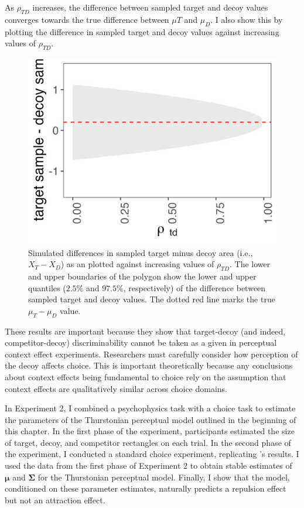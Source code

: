 As $\rho_{TD}$ increases, the difference between sampled target and decoy values converges towards the true difference between $\mu{T}$ and $\mu_{D}$. I also show this by plotting the difference in sampled target and decoy values against increasing values of $\rho_{TD}$.

\begin{figure}
   \includegraphics[width=125mm]{figures/sim_mvnorm_vary_r_td.jpeg}
   \caption{Simulated differences in sampled target minus decoy area (i.e., $X_{T}-X_{D}$) as an plotted against increasing values of $\rho_{TD}$. The lower and upper boundaries of the polygon show the lower and upper quantiles ($2.5\%$ and $97.5\%$, respectively) of the difference between sampled target and decoy values. The dotted red line marks the true $\mu_{T}-\mu_{D}$ value.}
   \label{fig:sim_mvnorm_vary_r_td}
\end{figure}

These results are important because they show that target-decoy (and indeed, competitor-decoy) discriminability cannot be taken as a given in perceptual context effect experiments. Researchers must carefully consider how perception of the decoy affects choice. This is important theoretically because any conclusions about context effects being fundamental to choice \parencite{trueblood2013not} rely on the assumption that context effects are qualitatively similar across choice domains.

In Experiment 2, I combined a psychophysics task with a choice task to estimate the parameters of the Thurstonian perceptual model outlined in the beginning of this chapter. In the first phase of the experiment, participants estimated the size of target, decoy, and competitor rectangles on each trial. In the second phase of the experiment, I conducted a standard choice experiment, replicating \textcite{spektorWhenGoodLooks2018b}'s results. I used the data from the first phase of Experiment 2 to obtain stable estimates of  $\boldsymbol{\mu}$ and $\boldsymbol{\Sigma}$ for the Thurstonian perceptual model. Finally, I show that the model, conditioned on these parameter estimates, naturally predicts a repulsion effect but not an attraction effect.  

